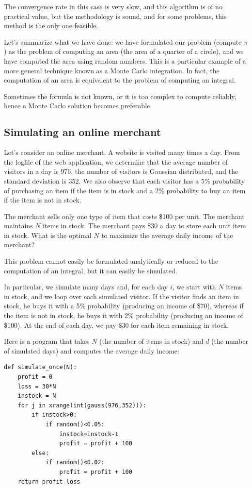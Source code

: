 \documentclass[justified,sixbynine]{tufte-book}
\theoremstyle{plain}%
\theoremstyle{definition}
\theoremstyle{remark}
\begin{document}
\begin{fullwidth}
The convergence rate in this case is very slow, and this algorithm is of no practical value, but the methodology is sound, and for some problems, this method is the only one feasible.

Let's summarize what we have done: we have formulated our problem (compute $%
\pi $) as the problem of computing an area (the area of a quarter of a
circle), and we have computed the area using random numbers. This is a
particular example of a more general technique known as a Monte Carlo
integration. In fact, the computation of an area is equivalent to the problem
of computing an integral.

Sometimes the formula is not known, or it is too complex to compute reliably, hence a Monte Carlo solution becomes preferable.


\goodbreak\subsection{Simulating an online merchant}

Let's consider an online merchant. A website is visited many times a day.
From the logfile of the web application, we determine
that the average number of visitors in a day is 976, the number of
visitors is Gaussian distributed, and the standard deviation is 352. We also observe that each visitor has a 5\% probability of purchasing an item
if the item is in stock and a 2\% probability to buy an item if the
item is not in stock.

The merchant sells only one type of item that costs \$100 per unit. The
merchant maintains $N$ items in stock. The merchant pays \$30 a day to store
each unit item in stock. What is the optimal $N$ to maximize the average
daily income of the merchant?

This problem cannot easily be formulated analytically or reduced to
the computation of an integral, but it can easily be simulated.

In particular, we simulate many days and, for each day $i$,
we start with $N$ items
in stock, and we loop over each simulated visitor. If the visitor
finds an item in stock, he buys it with a 5\% probability
(producing an income of \$70), whereas if the item is not in stock,
 he buys it with 2\% probability (producing an income of \$100).
At the end of each day, we pay \$30 for each item remaining in stock.

Here is a program that takes $N$ (the number of items in stock) and $d$ (the
number of simulated days) and computes the average daily income:
\begin{lstlisting}
def simulate_once(N):
    profit = 0
    loss = 30*N
    instock = N
    for j in xrange(int(gauss(976,352))):
        if instock>0:
            if random()<0.05:
                instock=instock-1
                profit = profit + 100
        else:
            if random()<0.02:
                profit = profit + 100
    return profit-loss


\end{lstlisting}
\end{fullwidth}
\end{document}
